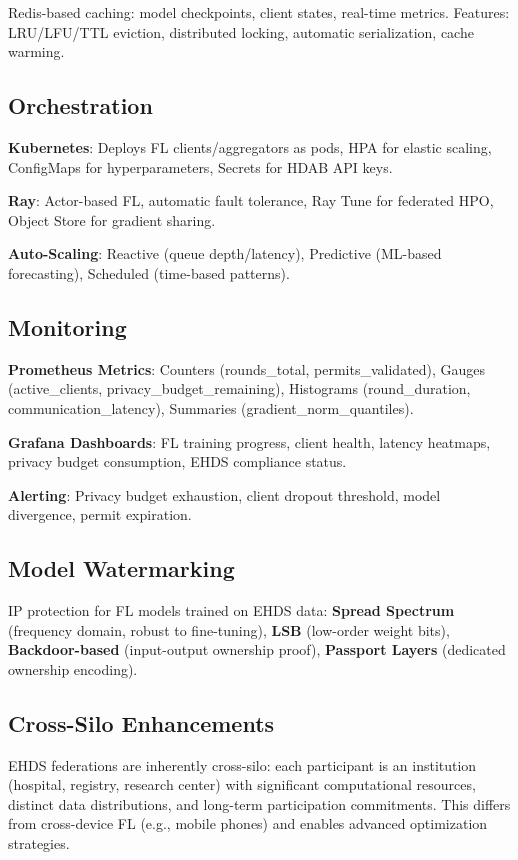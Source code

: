 \documentclass[conference]{IEEEtran}
\begin{document}
Redis-based caching: model checkpoints, client states, real-time metrics. Features: LRU/LFU/TTL eviction, distributed locking, automatic serialization, cache warming.

\subsection{Orchestration}

\textbf{Kubernetes}: Deploys FL clients/aggregators as pods, HPA for elastic scaling, ConfigMaps for hyperparameters, Secrets for HDAB API keys.

\textbf{Ray}: Actor-based FL, automatic fault tolerance, Ray Tune for federated HPO, Object Store for gradient sharing.

\textbf{Auto-Scaling}: Reactive (queue depth/latency), Predictive (ML-based forecasting), Scheduled (time-based patterns).

\subsection{Monitoring}

\textbf{Prometheus Metrics}: Counters (rounds\_total, permits\_validated), Gauges (active\_clients, privacy\_budget\_remaining), Histograms (round\_duration, communication\_latency), Summaries (gradient\_norm\_quantiles).

\textbf{Grafana Dashboards}: FL training progress, client health, latency heatmaps, privacy budget consumption, EHDS compliance status.

\textbf{Alerting}: Privacy budget exhaustion, client dropout threshold, model divergence, permit expiration.

\subsection{Model Watermarking}

IP protection for FL models trained on EHDS data: \textbf{Spread Spectrum} (frequency domain, robust to fine-tuning), \textbf{LSB} (low-order weight bits), \textbf{Backdoor-based} (input-output ownership proof), \textbf{Passport Layers} (dedicated ownership encoding).

\subsection{Cross-Silo Enhancements}

EHDS federations are inherently cross-silo: each participant is an institution (hospital, registry, research center) with significant computational resources, distinct data distributions, and long-term participation commitments. This differs from cross-device FL (e.g., mobile phones) and enables advanced optimization strategies.
\end{document}
